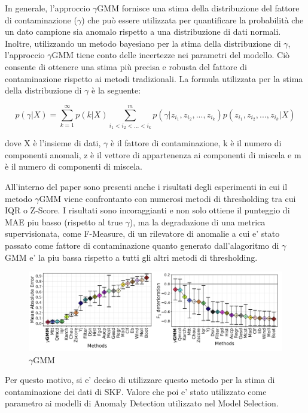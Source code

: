 In generale, l'approccio $\gamma$GMM fornisce una stima della distribuzione del fattore di contaminazione ($\gamma$) che può essere utilizzata per quantificare la probabilità che un dato campione sia anomalo rispetto a una distribuzione di dati normali. Inoltre, utilizzando un metodo bayesiano per la stima della distribuzione di $\gamma$, l'approccio $\gamma$GMM tiene conto delle incertezze nei parametri del modello. Ciò consente di ottenere una stima più precisa e robusta del fattore di contaminazione rispetto ai metodi tradizionali.
La formula utilizzata per la stima della distribuzione di $\gamma$ è la seguente:

\[p(\gamma | X) = \sum_{k=1}^{\infty} p(k | X) \sum_{i_1 < i_2 <...< i_k}^{m} p(\gamma | z_{i_1}, z_{i_2},..., z_{i_k}) p(z_{i_1}, z_{i_2},..., z_{i_k} | X)\]

dove X è l'insieme di dati, $\gamma$ è il fattore di contaminazione, k è il numero di componenti anomali, z è il vettore di appartenenza ai componenti di miscela e m è il numero di componenti di miscela.

All'interno del paper sono presenti anche i risultati degli esperimenti in cui il metodo $\gamma$GMM viene confrontanto con numerosi metodi di thresholding tra cui IQR o Z-Score. I risultati sono incoraggianti e non solo ottiene il punteggio di MAE piu basso (rispetto al true $\gamma$), ma la degradazione di una metrica supervisionata, come F-Measure, di un rilevatore di anomalie a cui e' stato passato come fattore di contaminazione quanto generato dall'alagoritmo di $\gamma$GMM e' la piu bassa rispetto a tutti gli altri metodi di thresholding. 
\begin{figure}[t]
	\centering
	\includegraphics[width=14cm, scale=1]{images/ygmm2}
	\caption{$\gamma$GMM}
	\label{ygmm2}
\end{figure}
Per questo motivo, si e' deciso di utilizzare questo metodo per la stima di contaminazione dei dati di SKF. Valore che poi e' stato utilizzato come parametro ai modelli di Anomaly Detection utilizzato nel Model Selection.
